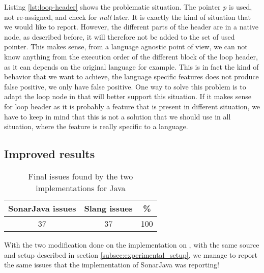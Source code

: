 

Listing \ref{lst:loop-header} shows the problematic situation. The pointer \emph{p} is used, not re-assigned, and check for \emph{null} later. 
It is exactly the kind of situation that we would like to report. 
However, the different parts of the header are in a native node, as described before, it will therefore not be added to the set of used pointer. 
This makes sense, from a language agnostic point of view, we can not know anything from the execution order of the different block of the loop header, as it can depends on the original language for example. 
This is in fact the kind of behavior that we want to achieve, the language specific features does not produce false positive, we only have false positive. 
One way to solve this problem is to adapt the loop node in \slang{} that will better support this situation. 
If it makes sense for loop header as it is probably a feature that is present in different situation, we have to keep in mind that this is not a solution that we should use in all situation, where the feature is really specific to a language.

\subsection{Improved results}
\label{subsec:improved_results}

\begin{table}[h]
	\centering
	\caption{Final issues found by the two implementations for Java}
	\label{table:final-sonarjava-vs-slang}
	\begin{tabular}{|c|c|c|}
		\hline
		\bf SonarJava issues & \bf Slang issues & \bf \% \\ \hline
		37 &  37 &  100 \\ \hline
	\end{tabular}
\end{table}

With the two modification done on the implementation on \slang{}, with the same source and setup described in section \ref{subsec:experimental_setup}, we manage to report the same issues that the implementation of SonarJava was reporting!

